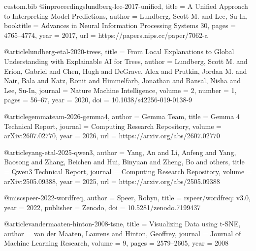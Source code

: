 \begin{filecontents*}[overwrite]{custom.bib}
@inproceedings{lundberg-lee-2017-unified,
    title     = {A Unified Approach to Interpreting Model Predictions},
    author    = {Lundberg, Scott M. and Lee, Su-In},
    booktitle = {Advances in Neural Information Processing Systems 30},
    pages     = {4765--4774},
    year      = {2017},
    url       = {https://papers.nips.cc/paper/7062-a}
}

@article{lundberg-etal-2020-trees,
    title   = {From Local Explanations to Global Understanding with Explainable {AI} for Trees},
    author  = {Lundberg, Scott M. and Erion, Gabriel and Chen, Hugh and DeGrave, Alex and
               Prutkin, Jordan M. and Nair, Bala and Katz, Ronit and Himmelfarb, Jonathan and
               Bansal, Nisha and Lee, Su-In},
    journal = {Nature Machine Intelligence},
    volume  = {2},
    number  = {1},
    pages   = {56--67},
    year    = {2020},
    doi     = {10.1038/s42256-019-0138-9}
}

@article{gemmateam-2026-gemma4,
    author  = {{Gemma Team}},
    title   = {Gemma 4 Technical Report},
    journal = {Computing Research Repository},
    volume  = {arXiv:2607.02770},
    year    = {2026},
    url     = {https://arxiv.org/abs/2607.02770}
}

@article{yang-etal-2025-qwen3,
    author  = {Yang, An and Li, Anfeng and Yang, Baosong and Zhang, Beichen and Hui, Binyuan and Zheng, Bo and others},
    title   = {{Qwen3} Technical Report},
    journal = {Computing Research Repository},
    volume  = {arXiv:2505.09388},
    year    = {2025},
    url     = {https://arxiv.org/abs/2505.09388}
}

@misc{speer-2022-wordfreq,
    author    = {Speer, Robyn},
    title     = {rspeer/wordfreq: v3.0},
    year      = {2022},
    publisher = {Zenodo},
    doi       = {10.5281/zenodo.7199437}
}

@article{vandermaaten-hinton-2008-tsne,
    title   = {Visualizing Data using t-{SNE}},
    author  = {van der Maaten, Laurens and Hinton, Geoffrey},
    journal = {Journal of Machine Learning Research},
    volume  = {9},
    pages   = {2579--2605},
    year    = {2008}
}
\end{filecontents*}

\documentclass[11pt]{article}

\usepackage[final]{acl}

